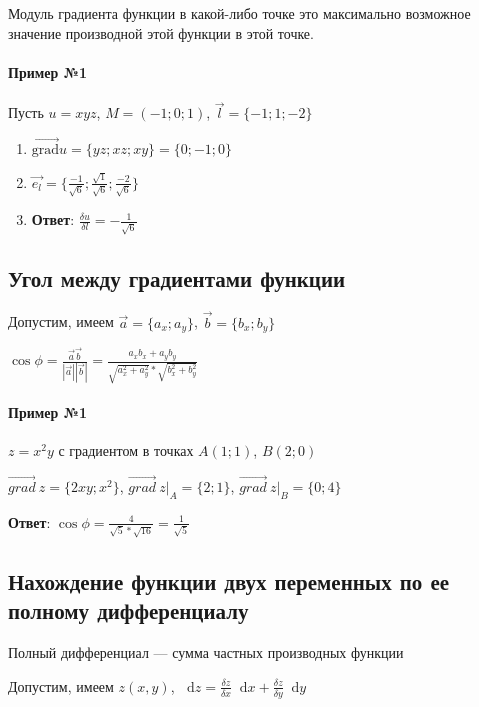 \documentclass{article}
\newcommand*\diff{\mathop{}\!\mathrm{d}}
\begin{document}
Модуль градиента функции в какой-либо точке это максимально возможное значение производной этой функции в этой точке.

\paragraph{Пример №1} Пусть $u = x y z$, $M = (-1; 0; 1)$, $\vec{l} = \{ -1; 1; -2 \}$

\begin{enumerate}
    \item $\vec{\text{grad}} u = \{ y z; x z; x y \} = \{ 0; -1; 0 \}$
    \item $\vec{e_{l}} = \{ \frac{-1}{\sqrt{6}}; \frac{\sqrt{1}}{\sqrt{6}}; \frac{-2}{\sqrt{6}} \}$
    \item \textbf{Ответ}: $\frac{\delta u}{\delta l} = - \frac{1}{\sqrt{6}}$
\end{enumerate}

\subsection{Угол между градиентами функции}

Допустим, имеем $\vec{a} = \{ a_{x}; a_{y} \}$, $\vec{b} = \{ b_{x}; b_{y} \}$

$\cos \phi = \frac{\vec{a} \vec{b}}{|\vec{a}| |\vec{b}|} = \frac{a_{x} b_{x} + a_{y} b_{y}}{\sqrt{a_{x}^2 + a_{y}^2} * \sqrt{b_{x}^2 + b_{y}^2}}$

\paragraph{Пример №1}

$z = x^2 y$ с градиентом в точках $A (1; 1)$, $B (2; 0)$

$\vec{grad} \ z = \{ 2x y; x^2 \}$, $\vec{grad} \ z \bigg|_{A} = \{ 2; 1 \}$, $\vec{grad} \ z \bigg|_{B} = \{ 0; 4 \}$

\textbf{Ответ}: $\cos \phi = \frac{4}{\sqrt{5} * \sqrt{16}} = \frac{1}{\sqrt{5}}$

\subsection{Нахождение функции двух переменных по ее полному дифференциалу}

Полный дифференциал — сумма частных производных функции

Допустим, имеем $z(x, y)$, $\diff z = \frac{\delta z}{\delta x} \diff x + \frac{\delta z}{\delta y} \diff y$
\end{document}
